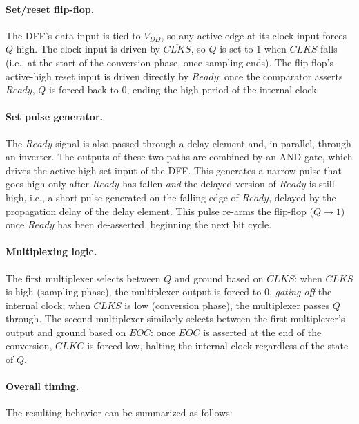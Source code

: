 \paragraph{Set/reset flip-flop.}
The DFF's data input is tied to $V_{DD}$, so any active edge at its clock
input forces $Q$ high. The clock input is driven by $\overline{CLKS}$, so
$Q$ is set to $1$ when $CLKS$ falls (i.e., at the start of the conversion
phase, once sampling ends). The flip-flop's active-high reset input is
driven directly by $Ready$: once the comparator asserts $Ready$, $Q$ is
forced back to $0$, ending the high period of the internal clock.

\paragraph{Set pulse generator.}
The $Ready$ signal is also passed through a delay element and, in
parallel, through an inverter. The outputs of these two paths are combined
by an AND gate, which drives the active-high set input of the DFF. This
generates a narrow pulse that goes high only after $Ready$ has fallen
\emph{and} the delayed version of $Ready$ is still high, i.e., a short
pulse generated on the falling edge of $Ready$, delayed by the propagation
delay of the delay element. This pulse re-arms the flip-flop ($Q \to 1$)
once $Ready$ has been de-asserted, beginning the next bit cycle.

\paragraph{Multiplexing logic.}
The first multiplexer selects between $Q$ and ground based on $CLKS$: when
$CLKS$ is high (sampling phase), the multiplexer output is forced to $0$,
\emph{gating off} the internal clock; when $CLKS$ is low (conversion
phase), the multiplexer passes $Q$ through. The second multiplexer
similarly selects between the first multiplexer's output and ground based
on $EOC$: once $EOC$ is asserted at the end of the conversion, $CLKC$ is
forced low, halting the internal clock regardless of the state of $Q$.

\paragraph{Overall timing.}
The resulting behavior can be summarized as follows:

